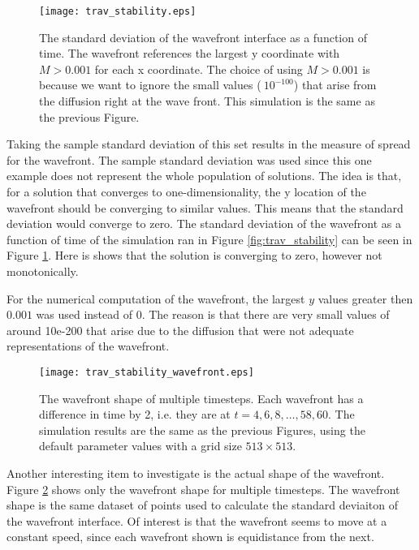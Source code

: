 \begin{figure}[h!tb]
  \centering
  \texttt{[image: trav\_stability.eps]}
  \caption{The standard deviation of the wavefront interface as a function of time.
    The wavefront references the largest y coordinate with $M > 0.001$ for each x coordinate.
    The choice of using $M > 0.001$ is because we want to ignore the small values ($~10^{-100}$) that arise from the diffusion right at the wave front. 
    This simulation is the same as the previous Figure.  }
  \label{fig:trav_stability_stddev}
\end{figure}

Taking the sample standard deviation of this set results in the measure of spread for the wavefront.
The sample standard deviation was used since this one example does not represent the whole population of solutions.
The idea is that, for a solution that converges to one-dimensionality, the y location of the wavefront should be converging to similar values.
This means that the standard deviation would converge to zero.
The standard deviation of the wavefront as a function of time of the simulation ran in Figure \ref{fig:trav_stability} can be seen in Figure \ref{fig:trav_stability_stddev}.
Here is shows that the solution is converging to zero, however not monotonically.

For the numerical computation of the wavefront, the largest $y$ values greater then $0.001$ was used instead of $0$.
The reason is that there are very small values of around 10e-200 that arise due to the diffusion that were not adequate representations of the wavefront.


\begin{figure}[h!tb]
  \centering
  \texttt{[image: trav\_stability\_wavefront.eps]}
  \caption{The wavefront shape of multiple timesteps.
    Each wavefront has a difference in time by 2, i.e. they are at $t = 4, 6, 8, \ldots, 58, 60$. 
    The simulation results are the same as the previous Figures, using the default parameter values with a grid size $513 \times 513$.
    }
  \label{fig:trav_wavefront}
\end{figure}

Another interesting item to investigate is the actual shape of the wavefront.
Figure \ref{fig:trav_wavefront} shows only the wavefront shape for multiple timesteps.
The wavefront shape is the same dataset of points used to calculate the standard deviaiton of the wavefront interface.
Of interest is that the wavefront seems to move at a constant speed, since each wavefront shown is equidistance from the next.


